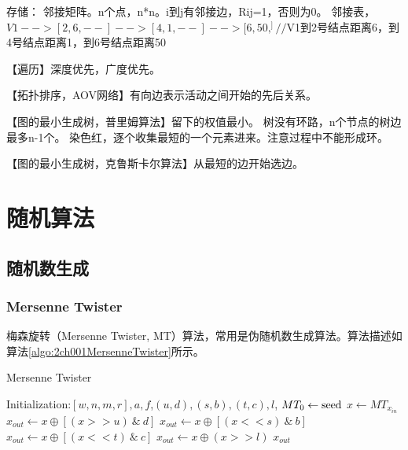 \documentclass[UTF8]{../computerUniverse}
\begin{document}
存储：
邻接矩阵。n个点，n*n。i到j有邻接边，Rij=1，否则为0。
邻接表，$V1-->[2,6,--]-->[4,1,--]-->[6,50,^]//$V1到2号结点距离6，到4号结点距离1，到6号结点距离50

【遍历】深度优先，广度优先。

【拓扑排序，AOV网络】有向边表示活动之间开始的先后关系。

【图的最小生成树，普里姆算法】留下的权值最小。
树没有环路，n个节点的树边最多n-1个。
染色红，逐个收集最短的一个元素进来。注意过程中不能形成环。

【图的最小生成树，克鲁斯卡尔算法】从最短的边开始选边。




\chapter{随机算法}


\section{随机数生成}

\subsection{Mersenne Twister}
梅森旋转（Mersenne Twister, MT）算法，常用是伪随机数生成算法。算法描述如算法\ref{algo:2ch001MersenneTwister}所示。

      \begin{algorithm}[ht]
        \caption{Mersenne Twister}\label{algo:2ch001MersenneTwister}
        \SetAlgoLined
        Initialization:$[w, n, m, r], a, f$,$(u,d),(s,b),(t,c),l$, $MT_0 \leftarrow {\rm seed}$\;
        $x \leftarrow MT_{x_{in}}$\;
        $x_{out} \leftarrow x \oplus [ (x >> u) \ \& \  d]$\;
        $x_{out} \leftarrow x \oplus [ (x << s) \ \& \ b]$\;
        $x_{out} \leftarrow x \oplus [ (x << t) \ \& \  c]$\;
        $x_{out} \leftarrow x \oplus  (x >> l) $\;
        \KwRet $x_{out}$\;
      \end{algorithm}
\end{document}
